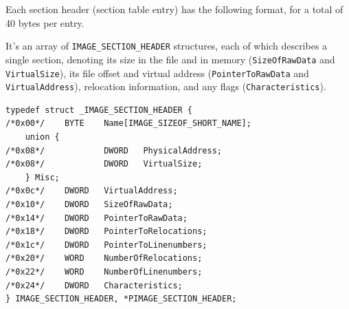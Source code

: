 Each section header (section table entry) has the following format, for a total of 40 bytes per entry.

It’s an array of \verb+IMAGE_SECTION_HEADER+ structures, each of which describes a single section, denoting its size in the file and in memory (\verb+SizeOfRawData+ and \verb+VirtualSize+), its file offset and virtual address (\verb+PointerToRawData+ and \verb+VirtualAddress+), relocation information, and any flags (\verb+Characteristics+).

\begin{verbatim}
typedef struct _IMAGE_SECTION_HEADER {
/*0x00*/    BYTE    Name[IMAGE_SIZEOF_SHORT_NAME];
    union {
/*0x08*/            DWORD   PhysicalAddress;
/*0x08*/            DWORD   VirtualSize;
    } Misc;
/*0x0c*/    DWORD   VirtualAddress;
/*0x10*/    DWORD   SizeOfRawData;
/*0x14*/    DWORD   PointerToRawData;
/*0x18*/    DWORD   PointerToRelocations;
/*0x1c*/    DWORD   PointerToLinenumbers;
/*0x20*/    WORD    NumberOfRelocations;
/*0x22*/    WORD    NumberOfLinenumbers;
/*0x24*/    DWORD   Characteristics;
} IMAGE_SECTION_HEADER, *PIMAGE_SECTION_HEADER;    
\end{verbatim}

